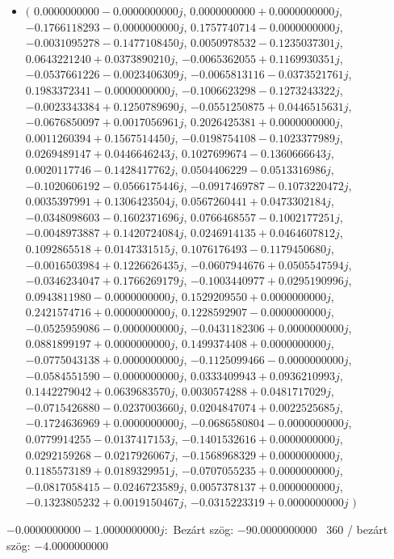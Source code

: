 \documentclass[14pt,a4paper]{article}
\begin{document}
\begin{itemize}
\item
$\big($
$0.0000000000-0.0000000000j$, $0.0000000000+0.0000000000j$, $-0.1766118293-0.0000000000j$, $0.1757740714-0.0000000000j$, $-0.0031095278-0.1477108450j$, $0.0050978532-0.1235037301j$, $0.0643221240+0.0373890210j$, $-0.0065362055+0.1169930351j$, $-0.0537661226-0.0023406309j$, $-0.0065813116-0.0373521761j$, $0.1983372341-0.0000000000j$, $-0.1006623298-0.1273243322j$, $-0.0023343384+0.1250789690j$, $-0.0551250875+0.0446515631j$, $-0.0676850097+0.0017056961j$, $0.2026425381+0.0000000000j$, $0.0011260394+0.1567514450j$, $-0.0198754108-0.1023377989j$, $0.0269489147+0.0446646243j$, $0.1027699674-0.1360666643j$, $0.0020117746-0.1428417762j$, $0.0504406229-0.0513316986j$, $-0.1020606192-0.0566175446j$, $-0.0917469787-0.1073220472j$, $0.0035397991+0.1306423504j$, $0.0567260441+0.0473302184j$, $-0.0348098603-0.1602371696j$, $0.0766468557-0.1002177251j$, $-0.0048973887+0.1420724084j$, $0.0246914135+0.0464607812j$, $0.1092865518+0.0147331515j$, $0.1076176493-0.1179450680j$, $-0.0016503984+0.1226626435j$, $-0.0607944676+0.0505547594j$, $-0.0346234047+0.1766269179j$, $-0.1003440977+0.0295190996j$, $0.0943811980-0.0000000000j$, $0.1529209550+0.0000000000j$, $0.2421574716+0.0000000000j$, $0.1228592907-0.0000000000j$, $-0.0525959086-0.0000000000j$, $-0.0431182306+0.0000000000j$, $0.0881899197+0.0000000000j$, $0.1499374408+0.0000000000j$, $-0.0775043138+0.0000000000j$, $-0.1125099466-0.0000000000j$, $-0.0584551590-0.0000000000j$, $0.0333409943+0.0936210993j$, $0.1442279042+0.0639683570j$, $0.0030574288+0.0481717029j$, $-0.0715426880-0.0237003660j$, $0.0204847074+0.0022525685j$, $-0.1724636969+0.0000000000j$, $-0.0686580804-0.0000000000j$, $0.0779914255-0.0137417153j$, $-0.1401532616+0.0000000000j$, $0.0292159268-0.0217926067j$, $-0.1568968329+0.0000000000j$, $0.1185573189+0.0189329951j$, $-0.0707055235+0.0000000000j$, $-0.0817058415-0.0246723589j$, $0.0057378137+0.0000000000j$, $-0.1323805232+0.0019150467j$, $-0.0315223319+0.0000000000j$
$\big)$
\end{itemize}
$-0.0000000000-1.0000000000j$:\
Bezárt szög: $-90.0000000000$ \
360 / bezárt szög: $-4.0000000000$\
\end{document}
